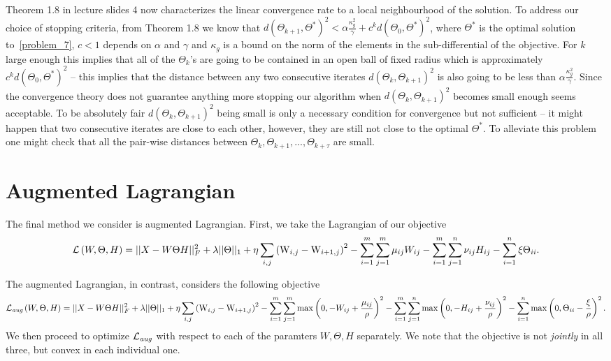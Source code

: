 \documentclass{article}
\newcommand{\0}{\mathrm{0}}
\newcommand{\1}{\mathrm{1}}
\newcommand{\W}{\mathrm{W}}
\begin{document}
Theorem 1.8 in lecture slides 4 now characterizes the linear convergence rate to a local neighbourhood of the solution. To address our choice of stopping criteria, from Theorem 1.8 we know that  $d(\Theta_{k+1},\Theta^*)^2 < \alpha\frac{\kappa_g^2}{\gamma} + c^kd(\Theta_0,\Theta^*)^2$, where $\Theta^*$ is the optimal solution to~\ref{problem_7}, $c<1$ depends on $\alpha$ and $\gamma$ and $\kappa_g$ is a bound on the norm of the elements in the sub-differential of the objective. For $k$ large enough this implies that all of the $\Theta_{k}$'s are going to be contained in an open ball of fixed radius which is approximately $c^kd(\Theta_0,\Theta^*)^2$ -- this implies that the distance between any two consecutive iterates $d(\Theta_k,\Theta_{k+1})^2$ is also going to be less than $\alpha\frac{\kappa_g^2}{\gamma}$. Since the convergence theory does not guarantee anything more stopping our algorithm when $d(\Theta_k,\Theta_{k+1})^2$ becomes small enough seems acceptable. To be absolutely fair $d(\Theta_k,\Theta_{k+1})^2$ being small is only a necessary condition for convergence but not sufficient -- it might happen that two consecutive iterates are close to each other, however, they are still not close to the optimal $\Theta^*$. To alleviate this problem one might check that all the pair-wise distances between $\Theta_k,\Theta_{k+1},...,\Theta_{k+\tau}$ are small.

\section{Augmented Lagrangian}

The final method we consider is augmented Lagrangian. First, we take the Lagrangian
of our objective
\begin{equation}
  \begin{aligned}
  {\cal L}\left(W, \Theta, H\right) = ||X - W\Theta H||_F^2 + \lambda ||\Theta||_1 + \eta\sum_{i,j}\left(\W_{i,j} - \W_{i+1,j}\right)^2 - \sum_{i=1}^m \sum_{j=1}^m \mu_{ij} W_{ij} - \sum_{i=1}^m \sum_{j=1}^n \nu_{ij} H_{ij} - \sum_{i=1}^n \xi \Theta_{ii}.
  \end{aligned}
\end{equation}

The augmented Lagrangian, in contrast, considers the following objective
{\scriptsize
\begin{equation}
  \begin{aligned}
  {\cal L}_{\textit{aug}}\left(W, \Theta, H\right) = ||X - W\Theta H||_F^2 + \lambda ||\Theta||_1 + \eta\sum_{i,j}\left(\W_{i,j} - \W_{i+1,j}\right)^2 - \sum_{i=1}^m \sum_{j=1}^m \max\left(0, -W_{ij} + \frac{\mu_{ij}}{\rho}\right)^2  - \sum_{i=1}^m \sum_{j=1}^n \max\left(0, -H_{ij} + \frac{\nu_{ij}}{\rho} \right)^2 - \sum_{i=1}^n \max\left(0, \Theta_{ii} - \frac{\xi}{\rho}\right)^2.
  \end{aligned}
\end{equation}
}
We then proceed to optimize ${\cal L}_{\textit{aug}}$ with
respect to each of the paramters $W, \Theta, H$ separately. We note
that the objective is not {\em jointly} in all three, but convex in
each individual one.
\end{document}
